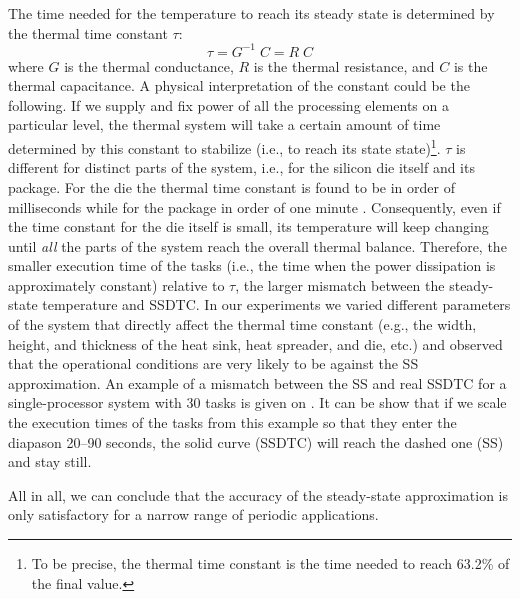 The time needed for the temperature to reach its steady state is determined by the thermal time constant $\tau$:
\[
  \tau = G^{-1} \; C = R \; C
\]
where $G$ is the thermal conductance, $R$ is the thermal resistance, and $C$ is the thermal capacitance. A physical interpretation of the constant could be the following. If we supply and fix power of all the processing elements on a particular level, the thermal system will take a certain amount of time determined by this constant to stabilize (i.e., to reach its state state)\footnote{To be precise, the thermal time constant is the time needed to reach 63.2\% of the final value.}. $\tau$ is different for distinct parts of the system, i.e., for the silicon die itself and its package. For the die the thermal time constant is found to be in order of milliseconds while for the package in order of one minute \cite{rao2007}. Consequently, even if the time constant for the die itself is small, its temperature will keep changing until \emph{all} the parts of the system reach the overall thermal balance. Therefore, the smaller execution time of the tasks (i.e., the time when the power dissipation is approximately constant) relative to $\tau$, the larger mismatch between the steady-state temperature and SSDTC. In our experiments we varied different parameters of the system that directly affect the thermal time constant (e.g., the width, height, and thickness of the heat sink, heat spreader, and die, etc.) and observed that the operational conditions are very likely to be against the SS approximation. An example of a mismatch between the SS and real SSDTC for a single-processor system with 30 tasks is given on . It can be show that if we scale the execution times of the tasks from this example so that they enter the diapason 20--90 seconds, the solid curve (SSDTC) will reach the dashed one (SS) and stay still.

All in all, we can conclude that the accuracy of the steady-state approximation is only satisfactory for a narrow range of periodic applications.
